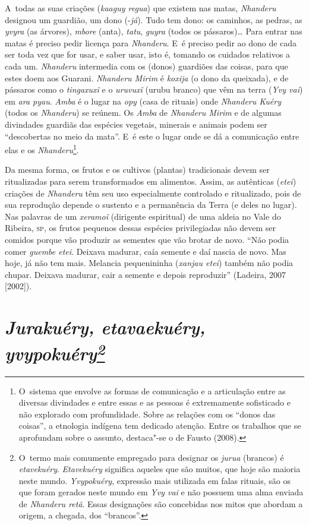 A~todas as suas criações (\emph{kaaguy regua}) que existem nas matas, \emph{Nhanderu}
designou um guardião, um dono (-\emph{já}). Tudo tem dono: os caminhos, as
pedras, as \emph{yvyra} (as árvores), \emph{mbore} (anta), \emph{tatu}, \emph{guyra} (todos os
pássaros)\ldots{} Para entrar nas matas é preciso pedir licença para
\emph{Nhanderu}. E~é preciso pedir ao dono de cada ser toda vez que for usar,
e saber usar, isto é, tomando os cuidados relativos a cada um. \emph{Nhanderu}
intermedia com os (donos) guardiões das coisas, para que estes doem aos
Guarani. \emph{Nhanderu Mirim} é \emph{koxija} (o dono da queixada), e de pássaros
como o \emph{tingaxuxĩ} e o
\emph{uruvuxĩ} (urubu branco) que vêm na terra (\emph{Yvy vai})
em \emph{ara pyau}. \emph{Amba} é o lugar na \emph{opy} (casa de rituais) onde \emph{Nhanderu
Kuéry} (todos os \emph{Nhanderu}) se reúnem. Os \emph{Amba} de \emph{Nhanderu Mirim} e de
algumas divindades guardiãs das espécies vegetais, minerais e animais
podem ser ``descobertas no meio da mata''. E~é este o lugar onde se dá a
comunicação entre elas e os \emph{Nhanderu}\footnote{O~sistema que envolve as
formas de comunicação e a articulação entre as diversas divindades e
entre essas e as pessoas é extremamente sofisticado e não explorado com
profundidade. Sobre as relações com os ``donos das coisas'', a etnologia
indígena tem dedicado atenção. Entre os trabalhos que se aprofundam
sobre o assunto, destaca"-se o de Fausto (2008). }. 

Da mesma forma, os frutos e os cultivos (plantas) tradicionais devem ser
ritualizadas para serem transformados em alimentos. Assim, as
autênticas (\emph{etei}) criações de \emph{Nhanderu} têm seu uso especialmente
controlado e ritualizado, pois de sua reprodução depende o sustento e a
permanência da Terra (e deles no lugar). Nas palavras de um
\emph{xeramoĩ} (dirigente espiritual) de uma aldeia no
Vale do Ribeira, \textsc{sp}, os frutos pequenos dessas espécies privilegiadas
não devem ser comidos porque vão produzir as sementes que vão brotar de
novo. ``Não podia comer \emph{guembe etei}. Deixava madurar, caía semente e daí
nascia de novo. Mas hoje, já não tem mais. Melancia pequenininha
(\emph{xanjau etei}) também não podia chupar. Deixava madurar, cair a semente
e depois reproduzir'' (Ladeira, 2007 [2002]).

\section{\emph{Jurakuéry, etavaekuéry, yvypokuéry\footnotesize\protect\footnote{\uppercase{O}~termo
mais comumente
empregado para designar os \emph{jurua} (brancos) é \emph{etavekuéry}. \emph{
\uppercase{E}tavekuéry}
significa aqueles que são muitos, que hoje são maioria neste mundo.
\emph{\uppercase{Y}vypokuéry}, expressão mais utilizada em falas rituais, são os que foram
gerados neste mundo em \emph{\uppercase{Y}vy vai} e não possuem uma alma enviada de
\emph{\uppercase{N}handeru retã}. \uppercase{E}ssas designações
são concebidas nos mitos que abordam a
origem, a chegada, dos ``brancos''.}}}



